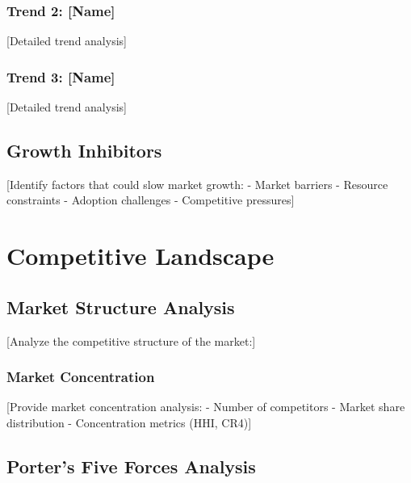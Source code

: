 \documentclass[11pt,letterpaper]{report}
\begin{document}
\subsection{Trend 2: [Name]}
[Detailed trend analysis]

\subsection{Trend 3: [Name]}
[Detailed trend analysis]

\section{Growth Inhibitors}

[Identify factors that could slow market growth:
- Market barriers
- Resource constraints
- Adoption challenges
- Competitive pressures]

\chapter{Competitive Landscape}

\section{Market Structure Analysis}

[Analyze the competitive structure of the market:]

\subsection{Market Concentration}

[Provide market concentration analysis:
- Number of competitors
- Market share distribution
- Concentration metrics (HHI, CR4)]

\section{Porter's Five Forces Analysis}

\end{document}
